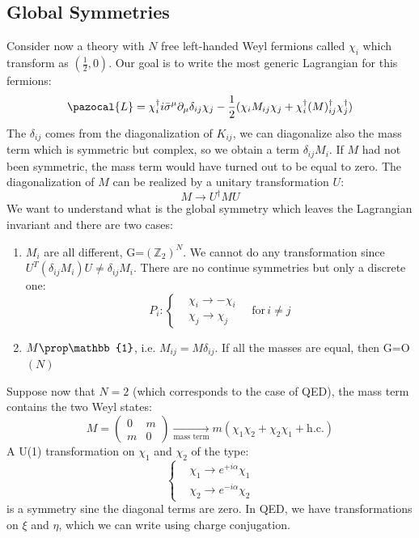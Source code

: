 \documentclass[../main.tex]{subfiles}
\begin{document}
\subsection{Global Symmetries}
Consider now a theory with $N$ free left-handed Weyl fermions called $\chi_i$ which transform as $(\frac{1}{2},0)$. Our goal is to write the most generic Lagrangian for this fermions:
\[
\pazocal{L}=\chi_i^\dagger i\bar{\sigma}^\mu\partial_\mu \delta_{ij}\chi_j-\frac{1}{2}(\chi_i M_{ij}\chi_j+\chi_i^\dagger(M)_{ij}^\dagger\chi_j^\dagger)
\]
The $\delta_{ij}$ comes from the diagonalization of $K_{ij}$, we can diagonalize also the mass term which is symmetric but complex, so we obtain a term $\delta_{ij}M_i$. If $M$ had not been symmetric, the mass term would have turned out to be equal to zero. The diagonalization of $M$ can be realized by a unitary transformation $U$:
\[
M\to U^\dagger MU
\]
We want to understand what is the global symmetry which leaves the Lagrangian invariant and there are two cases:
\begin{enumerate}
    \item $M_i$ are all different, G=$(\mathbb{Z}_2)^N$. We cannot do any transformation since $U^T(\delta_{ij}M_i)U\neq\delta_{ij}M_i$. There are no continue symmetries but only a discrete one:
    \[
    P_i:
    \left\{
    \begin{aligned}
    &\chi_i\to-\chi_i\\
    &\chi_j\to\chi_j
    \end{aligned}
    \quad
    \text{for}\,i\neq j
    \right.
    \]
    \item $M\prop\mathbb{1}$, i.e. $M_{ij}=M\delta_{ij}$. If all the masses are equal, then G=O$(N)$
\end{enumerate}
Suppose now that $N=2$ (which corresponds to the case of QED), the mass term contains the two Weyl states:
\[
M=\left(\begin{array}{cc}
    0 & m \\
    m & 0
\end{array}\right)
\xrightarrow[\text{mass term}]{}
m(\chi_1\chi_2+\chi_2\chi_1+\text{h.c.})
\]
A U(1) transformation on $\chi_1$ and $\chi_2$ of the type:
\[
\left\{
\begin{aligned}
&\chi_1\to e^{+i\alpha}\chi_1\\
&\chi_2\to e^{-i\alpha}\chi_2
\end{aligned}
\right.
\]
is a symmetry sine the diagonal terms are zero. In QED, we have transformations on $\xi$ and $\eta$, which we can write using charge conjugation.
\end{document}
